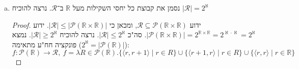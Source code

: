 \documentclass[]{article}
\newcommand\N     {\mathbb{N}}
\newcommand\R     {\mathbb{R}}
\newcommand\ps    {\mathcal{P}}
\newcommand\rca   {\mathcal{R}} %
\newcommand\ra    {\rangle}
\newcommand\la    {\langle}
\newcommand\rc    {\right\rceil}
\newcommand\az    {\aleph_0}
\newcommand\al    {\aleph}
\newcommand\taz   {2^{\aleph_0}}
\newcommand\tal   {2^{\aleph}}
\newcommand\op    {^{-1}}
\begin{document}
\begin{enumerate}[(a)]
\begin{proof}
			
			ידוע $ A \subseteq \N \to \{0, 1\} $ כלומר $ |A| \le |\N \to \{0, 1\}| $, ומחשבון עוצמות $ |A| \le \taz = \al $. בעבור הכיוון השני נמצא פונקציה חח"ע: 
			\[ h \colon (\N \to \{0, 1\}) \to A, \ h = \lambda f \in \N \to \{0, 1\}. \lambda n \in \N. \begin{cases}
					0 & n \equiv 0 \\
					1 & n \equiv 1 \\
					f(\frac{n - 2}{3}) & n \equiv 2 \\
			\end{cases} \pmod{3} \]	
			\textbf{מוגדרת היטב: }(טווח מתאים) יהי $ f \in \N \to \{0, 1\} $, נוכיח $ h(f) \in A $. בכל המקרים יוחזר $ 0 $ או $ 1 $, לכן $ h(f) \in \N \to \{0, 1\} $. ניגש להוכיח את התנאי השני. טענה: $ \mathfrak{A} := \{n \equiv 0 \mod 3 \mid n \in \N\} $ קבוצה סופית, סתירה בעבור הפונקציה החח""ע $ \lambda n \in \N. 3n $. מצד שני, $ |\mathfrak{A}| \le \az $ כי הוא מוכל בה, ולכן מקש"ב $ \mathfrak{A} = \az $. באופן דומה בעבור $ \mathfrak{B} := \{n \equiv 1 \mid n \in \N\} $. מהפיצול למקרים בפונקציה, נקבל $ h(f)[\mathfrak{A}] = 0, \ h(f)[\mathfrak{B}] = 1 $, ומשום ש־$ |\mathfrak{A}| = |\mathfrak{B}| = \az $, אזי $ |h(f)\op[\{0\}]| = |h(f)\op[\{1\}]| = \az $, לכן $ h(f) \in A $. \textbf{חח"ע: }יהי $ f_1, f_2 \in \N \to \{0, 1\} $ פונקציות שונות (לכן קיים $ n \in \N $ כך ש־$ f_1(n) \neq f_2(n) $), נוכיח $ h(f_1) \neq h(f_2) $. נניח בשלילה שוויון, בעבור $ 3m + 2$ יתקיים $ h(f_1)(3m + 2) = f_1(\tfrac{3m + 2 - 2}{3}) = f_1(m) \neq f_2(m) = f_2(\tfrac{3m + 2 - 2}{3}) = h(f_2)(3m + 2) $ (זאת כי $ 3m + 2 \equiv 2 \mod 3 $). \\
			סה"כ $ |\N \to \{0, 1\}| \le |A| \le \taz $, ומשום ש־$ |\N \to \{0, 1\}| = \taz $ מחשבון פונקציות, אזי מקש"ב $ |A| = \taz = \al $ – כדרוש. 
		\end{proof}
		\item נסמן את קבוצת כל יחסי השקילות מעל $ \R $ ב־$ \rca $. נרצה להוכיח $ |\rca| = \tal $ \begin{proof}
			ידוע $ \rca \subseteq \ps(\R \times \R) $, ומכאן כי $ |\rca| \le |\ps(\R \times \R)| $. ידוע $ |\ps(\R\times\R)| = 2^{\R\times\R} = 2^{\al \cdot \al} = \tal $. סה"כ $ |\rca| \le \tal $. נרצה להוכיח $ |\rca| \ge \tal $. נמצא פונקציה חח"ע מתאימה ($ \tal = |\ps(\R)| $): 
			\[ f \colon \ps(\R) \to \rca, \ f = \lambda R \in \ps(\R). \{\la r, r + 1 \ra \mid r \in R\} \cup \{\la r + 1, r \ra \mid r \in R\} \cup \{\la r, r \ra \mid r \in \R\} \]

\end{proof}
\end{enumerate}
\end{document}
